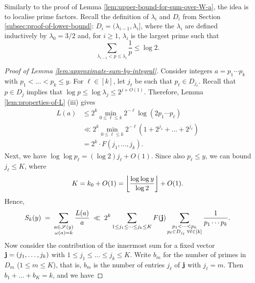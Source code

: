 Similarly to the proof of Lemma \ref{lem:upper-bound-for-sum-over-W-a}, the idea is to localise prime factors.
Recall the definition of $\lambda_i$ and $D_i$ from Section \ref{subsec:proof-of-lower-bound}: $D_i = (\lambda_{i - 1}, \lambda_i]$, where the $\lambda_i$ are defined inductively by $\lambda_0 = 3/2$ and, for $i \ge 1$, $\lambda_i$ is the largest prime such that 
\begin{equation*}
    \sum \limits_{\lambda_{i - 1} < p \le \lambda_i} \frac{1}{p} \le \log 2.
\end{equation*}

\begin{proof}[Proof of Lemma \ref{lem:approximate-sum-by-integral}]
    Consider integers $a = p_1 \cdots p_k$ with $p_1 < \dots < p_k \le y$.
    For $\ell \in [k]$, let $j_\ell$ be such that $p_\ell \in D_{j_\ell}$.
    Recall that $p \in D_{j}$ implies that $\log p \le \log \lambda_{j} \le 2^{j + O(1)}$.
    Therefore, Lemma \ref{lem:properties-of-L} (iii) gives
    \begin{align*}
        L(a) &\le 2^k \min \limits_{0 \le \ell \le k} 2^{-\ell} \log (2 p_1 \cdots p_\ell) \\
            &\ll 2^k \min \limits_{0 \le \ell \le k} 2^{-\ell} \left(1 + 2^{j_1} + \dots + 2^{j_\ell} \right) \\
            &= 2^k \cdot F(j_1, \dots, j_k).
    \end{align*}
    Next, we have $\log \log p_\ell = (\log 2) j_\ell + O(1)$. 
    Since also $p_\ell \le y$, we can bound $j_\ell \le K$, where
    \begin{equation*}
        K = k_0 + O(1) = \left\lfloor \frac{\log \log y}{\log 2} \right\rfloor + O(1).
    \end{equation*}
    Hence, 
    \begin{equation*}
        S_k(y) \;=\; \sum \limits_{\substack{a \in \mathscr{S}(y) \\ \omega(a) = k}} \frac{L(a)}{a} 
            \;\ll\; 2^k \sum \limits_{1 \le j_1 \le \dots \le j_k \le K} F(\mathbf{j}) \sum \limits_{\substack{p_1 < \dots < p_k \\ p_\ell \in D_{j_\ell} \; \forall \ell \in [k]}} \frac{1}{p_1 \cdots p_k}.
    \end{equation*}
    Now consider the contribution of the innermost sum for a fixed vector $\mathbf{j} = (j_1, \dots, j_k)$ with $1 \le j_1 \le \dots \le j_k \le K$.
    Write $b_m$ for the number of primes in $D_m$ ($1 \le m \le K$), that is, $b_m$ is the number of entries $j_\ell$ of $\mathbf{j}$ with $j_\ell = m$.
    Then $b_1 + \dots + b_K = k$, and we have

\end{proof}
